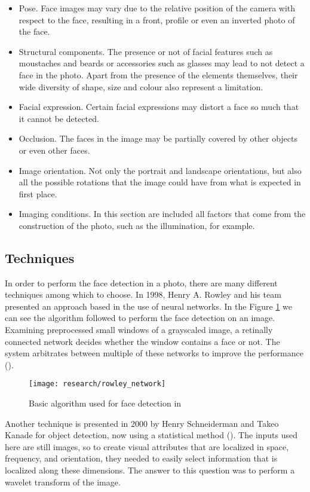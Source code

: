 	\begin{itemize}
		\item Pose. Face images may vary due to the relative position of the camera with respect to the face, resulting in a front, profile or even an inverted photo of the face.  
		\item Structural components. The presence or not of facial features such as moustaches and beards or accessories such as glasses may lead to not detect a face in the photo. Apart from the presence of the elements themselves, their wide diversity of shape, size and colour also represent a limitation.  
		\item Facial expression. Certain facial expressions may distort a face so much that it cannot be detected.    
		\item Occlusion. The faces in the image may be partially covered by other objects or even other faces.
		\item Image orientation. Not only the portrait and landscape orientations, but also all the possible rotations that the image could have from what is expected in first place.
		\item Imaging conditions. In this section are included all factors that come from the construction of the photo, such as the illumination, for example.  
	\end{itemize}

	\subsection{Techniques}
	\label{subsec:face_detec_techniques}
	In order to perform the face detection in a photo, there are many different techniques among which to choose. In 1998, Henry A. Rowley and his team presented an approach based in the use of neural networks. In the Figure \ref{fig:rowley_network} we can see the algorithm followed to perform the face detection on an image. Examining preprocessed small windows of a grayscaled image, a retinally connected network decides whether the window contains a face or not. The system arbitrates between multiple of these networks to improve the performance (\cite{rowley1998neural}). 

	\begin{figure}[!ht]
		\centering
		\texttt{[image: research/rowley\_network]}
		\caption{Basic algorithm used for face detection in \cite{rowley1998neural}}
		\label{fig:rowley_network}
	\end{figure}

	Another technique is presented in 2000 by Henry Schneiderman and Takeo Kanade for object detection, now using a statistical method (\cite{schneiderman2000statistical}). The inputs used here are still images, so to create visual attributes that are localized in space, frequency, and orientation, they needed to easily select information that is localized along these dimensions. The answer to this question was to perform a wavelet transform of the image. 

